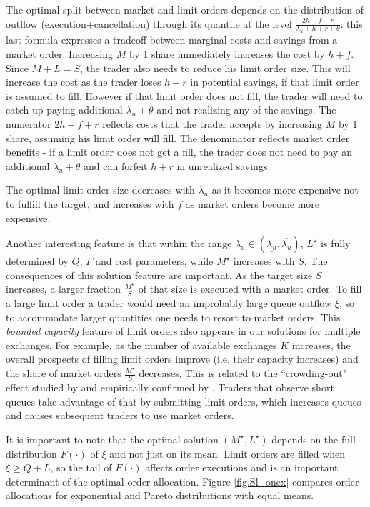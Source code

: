 \documentclass[opre,nonblindrev]{informs3}
\begin{document}
The optimal split between market and limit orders depends on the distribution of outflow (execution+cancellation) through its quantile at the level $\frac{2h+f+r}{\lambda_u+h+r+\theta}$: this last formula expresses a tradeoff between marginal costs and savings from a market order. Increasing $M$ by 1 share immediately increases the cost by $h+f$. Since $M+L=S$, the trader also needs to reduce his limit order size. This will increase the cost as the trader loses $h+r$ in potential savings, if that limit order is assumed to fill. However if that limit order does not fill, the trader will need to catch up paying additional $\lambda_u + \theta$ and not realizing any of the savings. The numerator $2h+f+r$ reflects costs that the trader accepts by increasing $M$ by 1 share, assuming his limit order will fill. The denominator reflects market order benefits - if a limit order does not get a fill, the trader does not need to pay an additional $\lambda_u + \theta$ and can forfeit $h+r$ in unrealized savings.

The optimal limit order size decreases with $\lambda_u$ as it becomes more expensive not to fulfill the target, and increases with $f$ as market orders become more expensive.

Another interesting feature is that within the range $\lambda_u\in(\underline{\lambda_u},\overline{\lambda_u})$, $L^{\star}$ is fully determined by $Q$, $F$ and cost parameters, while $M^{\star}$ increases with $S$. The consequences of this solution feature are important. As the target size $S$ increases, a larger fraction $\frac{M^{\star}}{S}$ of that size is executed with a market order. To fill a large limit order a trader would need an improbably large queue outflow $\xi$, so to accommodate larger quantities one needs to resort to market orders. This {\it bounded capacity} feature of limit orders also appears in our solutions for multiple exchanges. For example, as the number of available exchanges $K$ increases, the overall prospects of filling limit orders improve (i.e. their capacity increases) and the share of market orders $\frac{M^{\star}}{S}$ decreases. This is related to the ``crowding-out" effect studied by \citet{parlour98} and empirically confirmed by \citet{Cao2008}. Traders that observe short queues take advantage of that by submitting limit orders, which increases queues and causes subsequent traders to use market orders.

It is important to note that the optimal solution $(M^\star, L^\star)$ depends on the full distribution $F(\cdot)$ of $\xi$ and not just on its mean. Limit orders are filled when $\xi\geq Q+L$, so the tail of $F(\cdot)$ affects order executions and is an important determinant of the optimal order allocation. Figure \ref{fig.Sl_onex} compares order allocations for exponential and Pareto distributions   with equal means. 
\end{document}
